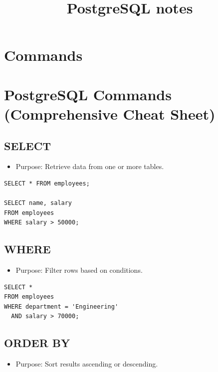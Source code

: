 \documentclass[10pt]{article}
\title{PostgreSQL notes}
\author{}
\date{}
\begin{document}
\maketitle

\tableofcontents

\newpage
\section{Commands}
\newpage
\section{PostgreSQL Commands (Comprehensive Cheat Sheet)}

\subsection{SELECT}
\begin{itemize}
    \item Purpose: Retrieve data from one or more tables.
\end{itemize}

\begin{verbatim}
SELECT * FROM employees;

SELECT name, salary
FROM employees
WHERE salary > 50000;
\end{verbatim}

\subsection{WHERE}
\begin{itemize}
    \item Purpose: Filter rows based on conditions.
\end{itemize}

\begin{verbatim}
SELECT *
FROM employees
WHERE department = 'Engineering'
  AND salary > 70000;
\end{verbatim}

\subsection{ORDER BY}
\begin{itemize}
    \item Purpose: Sort results ascending or descending.
\end{itemize}
\end{document}
